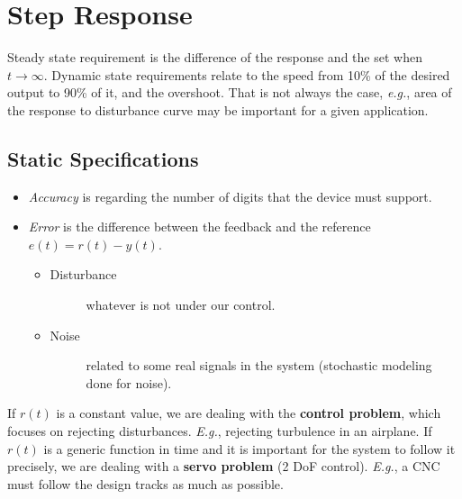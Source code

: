 
\section*{Step Response}

Steady state requirement is the difference of the response and the set when $t\to \infty$. Dynamic
state requirements relate to the speed from 10\% of the desired output to 90\% of it, and the
overshoot. That is not always the case, \emph{e.g.}, area of the response to disturbance curve may
be important for a given application.

\subsection*{Static Specifications}

\begin{itemize}
    \item \emph{Accuracy} is regarding the number of digits that the device must support.
    \item \emph{Error} is the difference between the feedback and the reference $e(t)=r(t)-y(t)$.
    \begin{itemize}
	\item \begin{description}
	    \item[Disturbance] whatever is not under our control.
	\end{description}
	\item \begin{description}
	    \item[Noise] related to some real signals in the system (stochastic modeling done for
		noise).
	\end{description}
    \end{itemize}
\end{itemize}

\begin{remark}
    If $r(t)$ is a constant value, we are dealing with the \textbf{control problem}, which focuses
    on rejecting disturbances. \emph{E.g.}, rejecting turbulence in an airplane.
    If $r(t)$ is a generic function in time and it is important for the system to follow it
    precisely, we are dealing with a \textbf{servo problem} (2 DoF control). \emph{E.g.}, a CNC
    must follow the design tracks as much as possible.
\end{remark}

